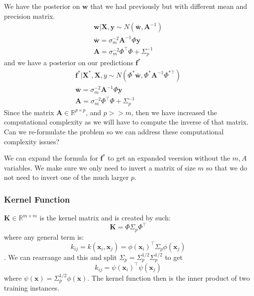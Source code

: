 \documentclass[11pt]{article}
\begin{document}
We have the posterior on $\textbf{w}$ that we had previously but with different mean and precision matrix.
\begin{gather}
  \textbf{w} | \textbf{X},\textbf{y} \sim N(\bar{\textbf{w}}, \textbf{A}^{-1}) \\
  \bar{\textbf{w}} = \sigma_m^{-2} \textbf{A}^{-1} \Phi \textbf{y} \\
  \textbf{A} = \sigma_m^{-2} \Phi^\top \Phi + \Sigma_p^{-1}
\end{gather}
and we have a posterior on our predictions $\textbf{f}^*$
\begin{gather}
  \textbf{f}^* | \textbf{X}^*, \textbf{X} ,y \sim N(\Phi^* \bar{\textbf{w}},\Phi^* \textbf{A}^{-1} \Phi^{* \top} ) \\
  \bar{\textbf{w}} = \sigma_m^{-2} \textbf{A}^{-1} \Phi \textbf{y} \\
  \textbf{A} = \sigma_m^{-2} \Phi^\top \Phi + \Sigma_p^{-1}
\end{gather}
Since the matrix $\textbf{A} \in \mathbb{R}^{p \times p}$, and $p >> m$, then we have increased the computational complexity as we will have to compute the inverse of that matrix.
Can we re-formulate the problem so we can address these computational complexity issues?

We can expand the formula for $\textbf{f}^*$ to get an expanded veersion without the $m, A$ variables.
We make sure we only need to invert a matrix of size $m$ so that we do not need to invert one of the much larger $p$.

\subsubsection{Kernel Function}
$\textbf{K} \in \mathbb{R}^{m \times m}$ is the kernel matrix and is created by such:
\begin{equation}
  \textbf{K} = \Phi \Sigma_p  \Phi^\top
\end{equation}
where any general term is:
\begin{equation}
  k_{ij} = k(\textbf{x}_i, \mathbf{x}_j) = \phi(\textbf{x}_i )^\top \Sigma_p \phi(\textbf{x}_j)
\end{equation}.
We can rearrange and this and split $\Sigma_p = \Sigma_p^{1/2} \Sigma_p^{1/2}$ to get
\begin{equation}
  k_{ij} = \psi (\textbf{x}_i)^\top \psi (\textbf{x}_j)
\end{equation}
where $\psi(\textbf{x}) = \Sigma_p^{1/2} \phi(\textbf{x})$.
The kernel function then is the inner product of two training instances.
\end{document}
